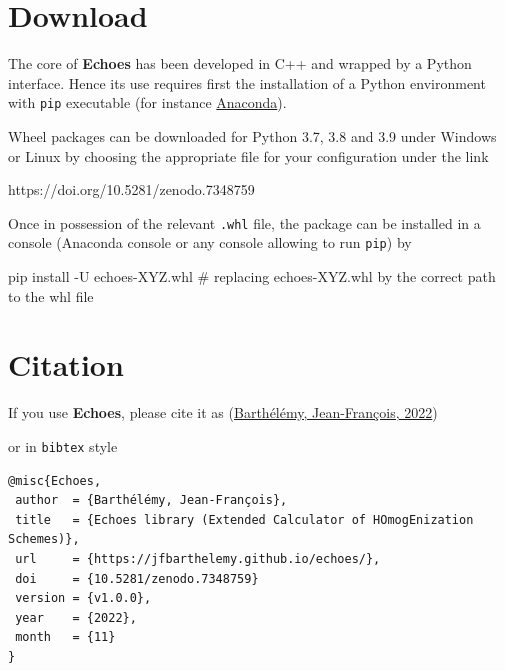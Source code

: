 \documentclass[
  letterpaper,
  DIV=11,
  numbers=noendperiod]{scrreprt}
\newenvironment{Shaded}{\begin{snugshade}}{\end{snugshade}}
\newcommand{\CommentTok}[1]{\textcolor[rgb]{0.37,0.37,0.37}{#1}}
\newcommand{\NormalTok}[1]{\textcolor[rgb]{0.00,0.23,0.31}{#1}}
\newcommand{\OperatorTok}[1]{\textcolor[rgb]{0.37,0.37,0.37}{#1}}
\begin{document}
\hypertarget{download}{%
\section*{Download}\label{download}}


The core of \textbf{Echoes} has been developed in C++ and wrapped by a
Python interface. Hence its use requires first the installation of a
Python environment with \texttt{pip} executable (for instance
\href{https://www.anaconda.com/products/distribution}{Anaconda}).

Wheel packages can be downloaded for Python 3.7, 3.8 and 3.9 under
Windows or Linux by choosing the appropriate file for your configuration
under the link

https://doi.org/10.5281/zenodo.7348759

Once in possession of the relevant \texttt{.whl} file, the package can
be installed in a console (Anaconda console or any console allowing to
run \texttt{pip}) by

\begin{Shaded}
\begin{Highlighting}[]
\NormalTok{pip install }\OperatorTok{{-}}\NormalTok{U echoes}\OperatorTok{{-}}\NormalTok{XYZ.whl }\CommentTok{\# replacing echoes{-}XYZ.whl by the correct path to the whl file}
\end{Highlighting}
\end{Shaded}

\hypertarget{citation}{%
\section*{Citation}\label{citation}}


If you use \textbf{Echoes}, please cite it as
(\protect\hyperlink{ref-echoes}{Barthélémy, Jean-François, 2022})

or in \texttt{bibtex} style

\begin{verbatim}
@misc{Echoes,
 author  = {Barthélémy, Jean-François},
 title   = {Echoes library (Extended Calculator of HOmogEnization Schemes)},
 url     = {https://jfbarthelemy.github.io/echoes/},
 doi     = {10.5281/zenodo.7348759}
 version = {v1.0.0},
 year    = {2022},
 month   = {11}
}
\end{verbatim}
\end{document}
